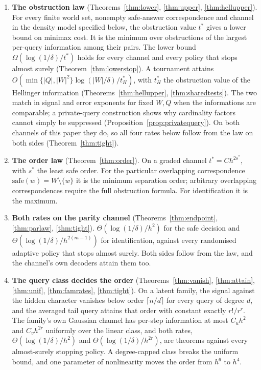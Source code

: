 \begin{enumerate}
\item[1)] \textbf{The obstruction law} (Theorems~\ref{thm:lower}, \ref{thm:upper},
\ref{thm:hellupper}). For every
finite world set, nonempty safe-answer correspondence and channel in the density model
specified below, the obstruction value $t^{*}$ gives a lower bound on minimax cost.
It is the minimum over obstructions of the largest per-query information among their pairs.
The lower bound $\Omega(\log(1/\delta)/t^{*})$ holds for every channel and every policy that
stops almost surely (Theorem~\ref{thm:lowerstop}). A
tournament attains $O(\min\{|Q|,|W|^{2}\}\log(|W|/\delta)/t^{*}_{H})$, with $t^{*}_{H}$ the
obstruction value of the Hellinger information (Theorems~\ref{thm:hellupper},
\ref{thm:sharedtests}). The two match in signal and error exponents for fixed $W,Q$ when the
informations are comparable; a private-query construction shows why cardinality factors
cannot simply be suppressed (Proposition~\ref{prop:privatequery}). On both channels of this paper they do, so all four
rates below follow from the law on both sides (Theorem~\ref{thm:tight}).
\item[2)] \textbf{The order law} (Theorem~\ref{thm:order}). On a graded channel $t^{*}=Ch^{2s^{*}}$,
with $s^{*}$ the least safe order. For the particular overlapping correspondence
$\mathrm{safe}(w)=W\setminus\{w\}$ it is the minimum separation order; arbitrary overlapping
correspondences require the full obstruction formula. For identification it is the maximum.
\item[3)] \textbf{Both rates on the parity channel} (Theorems~\ref{thm:endpoint},
\ref{thm:parlaw}, \ref{thm:tight}). $\Theta(\log(1/\delta)/h^{2})$ for the safe decision and
$\Theta(\log(1/\delta)/h^{2(m-1)})$ for identification, against every randomised adaptive policy
that stops almost surely. Both sides follow from the law, and the channel's own decoders attain
them too.
\item[4)] \textbf{The query class decides the order} (Theorems~\ref{thm:vanish},
\ref{thm:attain}, \ref{thm:unif}, \ref{thm:famrates}, \ref{thm:tight}). On a latent family, the signal against
the hidden character vanishes below order $\lceil n/d\rceil$ for every query of degree $d$, and
the averaged tail query attains that order with constant exactly $r!/r^{r}$. The family's own
Gaussian channel has per-step information at most $C_{u}h^{2}$ and $C_{v}h^{2r}$ uniformly over
the linear class, and both rates, $\Theta(\log(1/\delta)/h^{2})$ and
$\Theta(\log(1/\delta)/h^{2r})$, are theorems against every almost-surely stopping policy. A
degree-capped class breaks the uniform bound, and one parameter of nonlinearity moves the order
from $h^{6}$ to $h^{4}$.
\end{enumerate}

